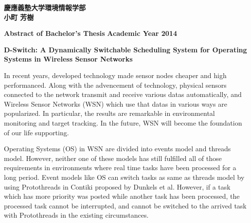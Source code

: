\begin{flushright}
\textbf{慶應義塾大学環境情報学部}\\
\textbf{小町 芳樹}
\end{flushright}

\newpage

\begin{center}
\textbf{\Large Abstract of Bachelor's Thesis}
\textbf{\Large Academic Year 2014}
\vspace{6.18mm}

\textbf{\Large D-Switch: A Dynamically Switchable Scheduling System for Operating Systems in Wireless Sensor Networks}
\end{center}

\vspace{10mm}

In recent years, 
developed technology made 
sensor nodes cheaper and high performanced.
Along with the advencement of technology,
physical sensors connected to the network
transmit and receive various datas automatically,
and Wireless Sensor Networks (WSN) which use that datas in various ways are popularized.
In particular, the results are remarkable
in environmental monitoring and target tracking.
In the future, WSN will become the foundation of our life supporting. 

Operating Systems (OS) in WSN
are divided into events model and threads model.
However, neither one of these models has still fulfilled 
all of those requirements
in environments where 
real time tasks have been processed 
for a long period.
Event models like OS can switch tasks as same as 
threads model
by using Protothreads\cite{Dunkels:2006:PSE:1182807.1182811} 
in Contiki\cite{Dunkels:2004:CLF:1032658.1034117}
proposed by Dunkels et al.
However, 
if a task which has more priority was posted 
while another task has been processed,
the processed task cannot be interrupted,
and cannot be switched to the arrived task 
with Protothreads
in the existing circumstances.

